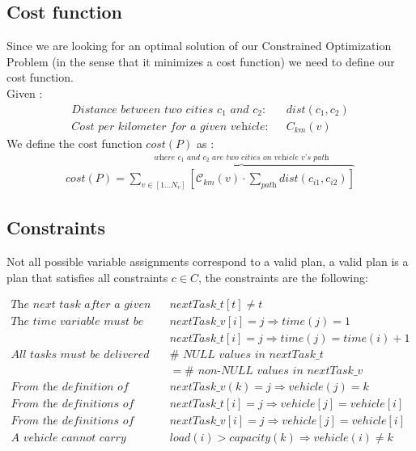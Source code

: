\documentclass[11pt]{article}
\begin{document}
\subsection{Cost function}
Since we are looking for an optimal solution of our Constrained Optimization Problem (in the sense that it minimizes a cost function) we need to define our cost function. \\

Given :
\begin{align*}
    \textit{Distance between two cities $c_1$ and $c_2$:} && dist(c_1,c_2) \\
    \textit{Cost per kilometer for a given vehicle:} && \textit{C}_{km} (v)
\end{align*}
We define the cost function $cost(P)$ as :
\begin{align*}
    cost(P) =  \overbrace{  \sum_{v \in [1...N_v]}  \left[ \mathcal{C}_{km}(v) \cdot  \sum_{\textit{path}} dist(c_{i1},c_{i2}) \right]}^{\textit{where $c_1$ and $c_2$ are two cities on vehicle v's path}}
\end{align*}

\subsection{Constraints}
Not all possible variable assignments correspond to a valid plan, a valid plan is a plan that satisfies all constraints $c\in C$, the constraints are the following:

\begin{align*}
    \textit{The next task after a given task t cannot be itself} 
    && nextTask\_t[t] \neq t \\
    \textit{The time variable must be coherent} 
    && nextTask\_v[i] = j \Rightarrow time(j) = 1 \\
    \textit{} && nextTask\_t[i] = j \Rightarrow time(j) = time(i)+1 \\
    \textit{All tasks must be delivered} && \#\textit{ NULL values in nextTask\_t}\\ && = \#\textit{ non-NULL values in nextTask\_v} \\
    \textit{From the definition of vehicle} && nextTask\_v(k) = j \Rightarrow vehicle(j) = k \\
    \textit{From the definitions of nextTask\_t and vehicle} && nextTask\_t[i] = j \Rightarrow vehicle[j] = vehicle[i] \\
    \textit{From the definitions of nextTask\_v and vehicle} && nextTask\_v[i] = j \Rightarrow vehicle[j] = vehicle[i] \\
    \textit{A vehicle cannot carry more than it's capacity} && load(i) > capacity(k) \Rightarrow vehicle(i) \neq k
\end{align*}
\end{document}
